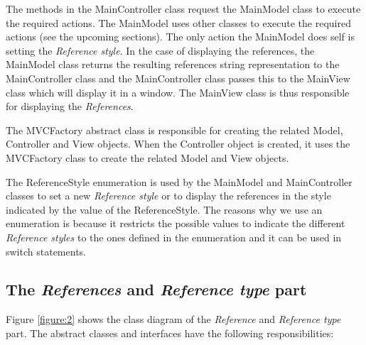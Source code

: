 \documentclass[a4paper]{article}
\begin{document}
The methods in the MainController class request the MainModel class to execute the required actions. The MainModel uses other classes to execute the required actions (see the upcoming sections). The only action the MainModel does self is setting the \textit{Reference style}. In the case of displaying the references, the MainModel class returns the resulting references string representation to the MainController class and the MainController class passes this to the MainView class which will display it in a window. The MainView class is thus responsible for displaying the \textit{References}. 

The MVCFactory abstract class is responsible for creating the related Model, Controller and View objects. When the Controller object is created, it uses the MVCFactory class to create the related Model and View objects.

The ReferenceStyle enumeration is used by the MainModel and MainController classes to set a new \textit{Reference style} or to display the references in the style indicated by the value of the ReferenceStyle. The reasons why we use an enumeration is because it restricts the possible values to indicate the different \textit{Reference styles} to the ones defined in the enumeration and it can be used in switch statements.


\subsection{The \textit{References} and \textit{Reference type} part} \label{section:references}
Figure \ref{figure:2} shows the class diagram of the \textit{Reference} and \textit{Reference type} part. The abstract classes and interfaces have the following responsibilities: 
\end{document}
